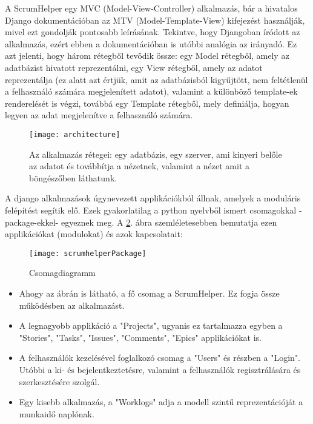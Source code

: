 A ScrumHelper egy MVC (Model-View-Controller) alkalmazás, bár a hivatalos Django dokumentációban az MTV (Model-Template-View) kifejezést használják, mivel ezt gondolják pontosabb leírásának. Tekintve, hogy Djangoban íródott az alkalmazás, ezért ebben a dokumentációban is utóbbi analógia az irányadó. Ez azt jelenti, hogy három rétegből tevődik össze: egy Model rétegből, amely az adatbázist hivatott reprezentálni, egy View rétegből, amely az adatot reprezentálja (ez alatt azt értjük, amit az adatbázisból kigyűjtött, nem feltétlenül a felhasználó számára megjelenített adatot), valamint a különböző template-ek renderelését is végzi, továbbá egy Template rétegből, mely definiálja, hogyan legyen az adat megjelenítve a felhasználó számára.

\begin{figure}[H]
	\centering
	\texttt{[image: architecture]}
	\caption{Az alkalmazás rétegei: egy adatbázis, egy szerver, ami kinyeri belőle az adatot és továbbítja a nézetnek, valamint a nézet amit a böngészőben láthatunk.}
	\label{fig:architecture}
\end{figure}

A django alkalmazások úgynevezett applikációkból állnak, amelyek a moduláris felépítést segítik elő. Ezek gyakorlatilag a python nyelvből ismert csomagokkal -package-ekkel- egyeznek meg. A \ref{fig:packages}. ábra szemléletesebben bemutatja ezen applikációkat (modulokat) és azok kapcsolatait:

\begin{figure}[H]
	\centering
	\texttt{[image: scrumhelperPackage]}
	\caption{Csomagdiagramm}
	\label{fig:packages}
\end{figure}

\pagebreak

\begin{itemize}
 	\item Ahogy az ábrán is látható, a fő csomag a ScrumHelper. Ez fogja össze működésben az alkalmazást.
	\item A legnagyobb applikáció a "Projects", ugyanis ez tartalmazza egyben a "Stories", "Tasks", "Issues", "Comments", "Epics" applikációkat is.
	\item A felhasználók kezelésével foglalkozó csomag a "Users" és részben a "Login". Utóbbi a ki- és bejelentkeztetésre, valamint a felhasználók regisztrálására és szerkesztésére szolgál.
	\item Egy kisebb alkalmazás, a "Worklogs" adja a modell szintű reprezentációját a munkaidő naplónak.
\end{itemize}

